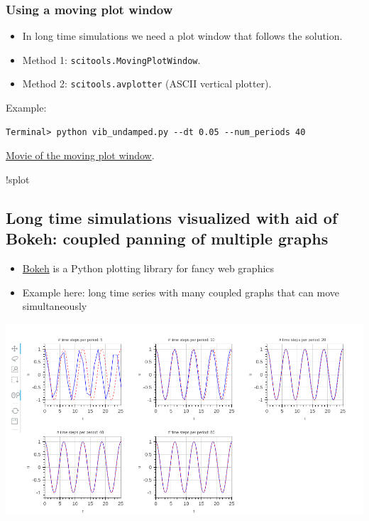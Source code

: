 \documentclass{beamer}
\begin{document}
\begin{frame}
\frametitle{Using a moving plot window}

\begin{itemize}
 \item In long time simulations we need a plot window that follows
   the solution.

 \item Method 1: \texttt{scitools.MovingPlotWindow}.

 \item Method 2: \texttt{scitools.avplotter} (ASCII vertical plotter).
\end{itemize}

\noindent
Example:
\begin{verbatim}
Terminal> python vib_undamped.py --dt 0.05 --num_periods 40
\end{verbatim}

\href{{http://tinyurl.com/opdfafk/pub/mov-vib/vib_undamped_dt0.05/index.html}}{Movie of the moving plot window}.

!splot
\subsection{Long time simulations visualized with aid of Bokeh: coupled panning of multiple graphs}

\begin{itemize}
 \item \href{{http://bokeh.pydata.org/en/latest/docs/quickstart.html}}{Bokeh} is a
   Python plotting library for fancy web graphics

 \item Example here: long time series with many coupled graphs that can move
   simultaneously
\end{itemize}

\noindent
\centerline{\includegraphics[width=1.0\linewidth]{fig-vib/bokeh_gridplot1.png}}




\end{frame}
\end{document}
